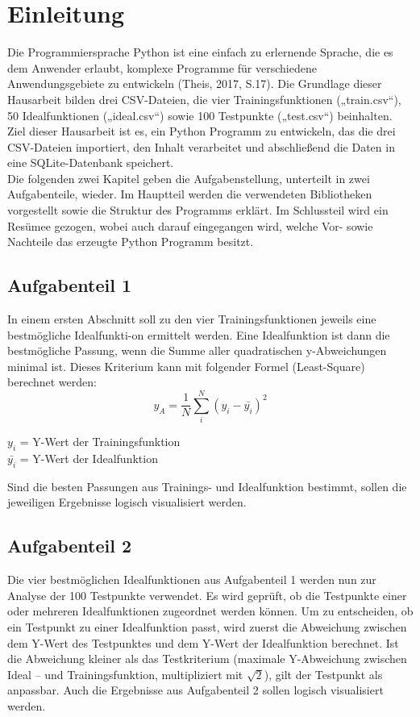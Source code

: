 \documentclass[11pt,a4paper]{scrreprt}
\begin{document}


\chapter{Einleitung}
\label{cha:Einleitung}
Die Programmiersprache Python ist eine einfach zu erlernende Sprache, die es dem Anwender erlaubt, komplexe Programme für verschiedene Anwendungsgebiete zu entwickeln (Theis, 2017, S.17).
Die Grundlage dieser Hausarbeit bilden drei CSV-Dateien, die vier Trainingsfunktionen („train.csv“), 50 Idealfunktionen („ideal.csv“) sowie 100 Testpunkte („test.csv“) beinhalten.
Ziel dieser Hausarbeit ist es, ein Python Programm zu entwickeln, das die drei CSV-Dateien importiert, den Inhalt verarbeitet und abschließend die Daten in eine SQLite-Datenbank speichert.\\
Die folgenden zwei Kapitel geben die Aufgabenstellung, unterteilt in zwei Aufgabenteile, wieder. Im Hauptteil werden die verwendeten Bibliotheken vorgestellt sowie die Struktur des Programms erklärt. Im Schlussteil wird ein Resümee gezogen, wobei auch darauf eingegangen wird, welche Vor- sowie Nachteile das erzeugte Python Programm besitzt. 


\section{Aufgabenteil 1}
\label{sec:Aufgabenteil1}

In einem ersten Abschnitt soll zu den vier Trainingsfunktionen jeweils eine bestmögliche Idealfunkti-on ermittelt werden. Eine Idealfunktion ist dann die bestmögliche Passung, wenn die Summe aller quadratischen y-Abweichungen minimal ist. Dieses Kriterium kann mit folgender Formel (Least-Square) berechnet werden:
\begin{equation}
\label{eq:leastsquare}
y_{A}= \frac{1}{N}\sum_{i}^{N} (y_{i}-\bar{y_{i}})^2 
\end{equation}
\begin{flushleft}
$y_{i}$ = Y-Wert der Trainingsfunktion \\
$\bar{y_{i}}$ = Y-Wert der Idealfunktion
\end{flushleft}
Sind die besten Passungen aus Trainings- und Idealfunktion bestimmt, sollen die jeweiligen Ergebnisse logisch visualisiert werden.

\section{Aufgabenteil 2}
\label{sec:Aufgabenteil2}
Die vier bestmöglichen Idealfunktionen aus Aufgabenteil 1 werden nun zur Analyse der 100 Testpunkte verwendet. Es wird geprüft, ob die Testpunkte einer oder mehreren Idealfunktionen zugeordnet werden können. Um zu entscheiden, ob ein Testpunkt zu einer Idealfunktion passt, wird zuerst die Abweichung zwischen dem Y-Wert des Testpunktes und dem Y-Wert der Idealfunktion berechnet. Ist die Abweichung kleiner als das Testkriterium (maximale Y-Abweichung zwischen Ideal – und Trainingsfunktion, multipliziert mit $\sqrt{2}$), gilt der Testpunkt als anpassbar. Auch die Ergebnisse aus Aufgabenteil 2 sollen logisch visualisiert werden. 
\end{document}
